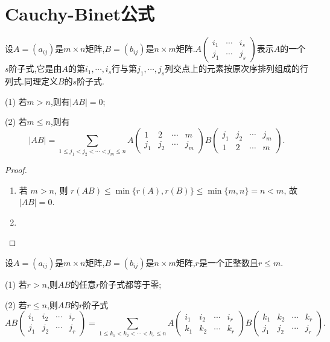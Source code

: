 \documentclass[../../main.tex]{subfiles}%
\begin{document}
\section{Cauchy-Binet公式}

\begin{theorem}\label{theorem:Cauchy-Binet公式}
设\(A=(a_{ij})\)是\(m\times n\)矩阵,\(B=(b_{ij})\)是\(n\times m\)矩阵.\(A\left(\begin{matrix}
i_1 & \cdots & i_s\\
j_1 & \cdots & j_s
\end{matrix}\right)\)表示\(A\)的一个\(s\)阶子式,它是由\(A\)的第\(i_1,\cdots,i_s\)行与第\(j_1,\cdots,j_s\)列交点上的元素按原次序排列组成的行列式.同理定义\(B\)的\(s\)阶子式.

(1) 若\(m > n\),则有\(\vert AB\vert=0\);

(2) 若\(m\leqslant  n\),则有
\[\vert AB\vert=\sum_{1\leqslant  j_1<j_2<\cdots<j_m\leqslant  n}A\left(\begin{matrix}
1 & 2 & \cdots & m\\
j_1 & j_2 & \cdots & j_m
\end{matrix}\right)B\left(\begin{matrix}
j_1 & j_2 & \cdots & j_m\\
1 & 2 & \cdots & m
\end{matrix}\right).\]
\end{theorem}
\begin{proof}
\begin{enumerate}[(1)]
\item 若 \(m > n\), 则 \(r(AB) \leqslant  \min\{r(A), r(B)\} \leqslant  \min\{m, n\} = n < m\), 故 \(|AB| = 0\).

\item 
\end{enumerate}

\end{proof}

\begin{corollary}\label{corollary:Cauchy-Binet公式推论}
设\(A=(a_{ij})\)是\(m\times n\)矩阵,\(B=(b_{ij})\)是\(n\times m\)矩阵,\(r\)是一个正整数且\(r\leqslant  m\).

(1) 若\(r > n\),则\(AB\)的任意\(r\)阶子式都等于零;

(2) 若\(r\leqslant  n\),则\(AB\)的\(r\)阶子式
\[AB\left(\begin{matrix}
i_1 & i_2 & \cdots & i_r\\
j_1 & j_2 & \cdots & j_r
\end{matrix}\right)=\sum_{1\leqslant  k_1<k_2<\cdots<k_r\leqslant  n}A\left(\begin{matrix}
i_1 & i_2 & \cdots & i_r\\
k_1 & k_2 & \cdots & k_r
\end{matrix}\right)B\left(\begin{matrix}
k_1 & k_2 & \cdots & k_r\\
j_1 & j_2 & \cdots & j_r
\end{matrix}\right).\]
\end{corollary}
\end{document}
